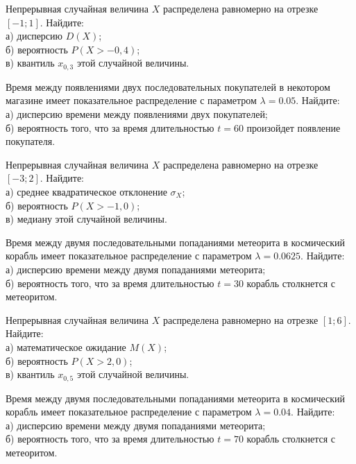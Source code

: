 \vfill

\newpage\setcounter{zad}{0}

\z Непрерывная случайная величина $X$ распределена равномерно на отрезке $[-1; 1]$. Найдите: \\ \quad а) дисперсию $D(X)$; \\ \quad б) вероятность $P(X>-0{,}4)$; \\ \quad в) квантиль $x_{0{,}3}$ этой случайной величины.


\vfill

\z Время между появлениями двух последовательных покупателей в некотором магазине имеет показательное распределение с параметром $\lambda = 0.05$. Найдите: \\ \quad а) дисперсию времени между появлениями двух покупателей; \\ \quad б) вероятность того, что за время длительностью $t = 60$  произойдет появление покупателя.
 

\vfill

\newpage\setcounter{zad}{0}

\z Непрерывная случайная величина $X$ распределена равномерно на отрезке $[-3; 2]$. Найдите: \\ \quad а) среднее квадратическое отклонение $\sigma_X$; \\ \quad б) вероятность $P(X>-1{,}0)$; \\ \quad в) медиану этой случайной величины.


\vfill

\z Время между двумя последовательными попаданиями метеорита в космический корабль имеет показательное распределение с параметром $\lambda = 0.0625$. Найдите: \\ \quad а) дисперсию времени между двумя попаданиями метеорита; \\ \quad б) вероятность того, что за время длительностью $t = 30$ корабль  столкнется с метеоритом.
 

\vfill

\newpage\setcounter{zad}{0}

\z Непрерывная случайная величина $X$ распределена равномерно на отрезке $[1; 6]$. Найдите: \\ \quad а) математическое ожидание $M(X)$; \\ \quad б) вероятность $P(X>2{,}0)$; \\ \quad в) квантиль $x_{0{,}5}$ этой случайной величины.


\vfill

\z Время между двумя последовательными попаданиями метеорита в космический корабль имеет показательное распределение с параметром $\lambda = 0.04$. Найдите: \\ \quad а) дисперсию времени между двумя попаданиями метеорита; \\ \quad б) вероятность того, что за время длительностью $t = 70$ корабль  столкнется с метеоритом.
 

